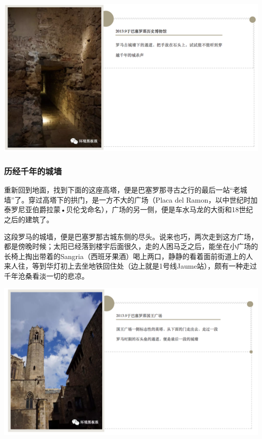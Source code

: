 \documentclass[
]{book}
\begin{document}
\includegraphics[width=8.33in]{images/xt18}

\hypertarget{ux5386ux7ecfux5343ux5e74ux7684ux57ceux5899}{%
\subsubsection{历经千年的城墙}\label{ux5386ux7ecfux5343ux5e74ux7684ux57ceux5899}}

重新回到地面，找到下面的这座高塔，便是巴塞罗那寻古之行的最后一站``老城墙''了。穿过高塔下的拱门，是一方不大的广场（Placa del Ramon，以中世纪时加泰罗尼亚伯爵拉蒙•贝伦戈命名），广场的另一侧，便是车水马龙的大街和18世纪之后的建筑了。

这段罗马的城墙，便是巴塞罗那古城东侧的尽头。说来也巧，两次走到这方广场，都是傍晚时候；太阳已经落到楼宇后面很久，走的人困马乏之后，能坐在小广场的长椅上掏出带着的Sangria（西班牙果酒）喝上两口，静静的看着面前街道上的人来人往，等到华灯初上去坐地铁回住处（边上就是1号线Jaume站），颇有一种走过千年沧桑看淡一切的悲凉。

\includegraphics[width=8.33in]{images/xt19}
\end{document}
